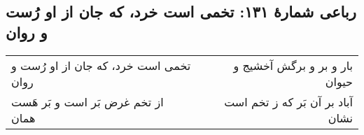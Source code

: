 \begin{center}
\section*{رباعی شمارهٔ ۱۳۱: تخمی است خرد، که جان از او رُست و روان}
\label{sec:131}
\begin{longtable}{l p{0.5cm} r}
تخمی است خرد، که جان از او رُست و روان
&&
بار و بر و برگش آخشیج و حیوان
\\
از تخم غرض بَر است و بَر هَست همان
&&
آباد بر آن بَر که ز تخم است نشان
\\
\end{longtable}
\end{center}
